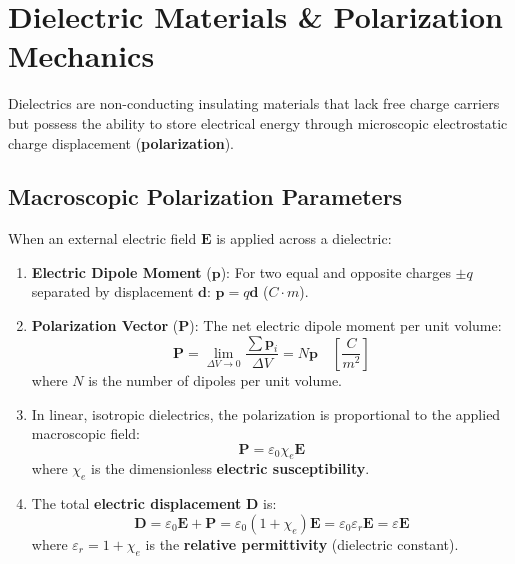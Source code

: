 \section{Dielectric Materials \& Polarization Mechanics}

Dielectrics are non-conducting insulating materials that lack free charge carriers but possess the ability to store electrical energy through microscopic electrostatic charge displacement (\textbf{polarization}).

\subsection{Macroscopic Polarization Parameters}
When an external electric field $\mathbf{E}$ is applied across a dielectric:
\begin{enumerate}
    \item \textbf{Electric Dipole Moment} ($\mathbf{p}$): For two equal and opposite charges $\pm q$ separated by displacement $\mathbf{d}$: $\mathbf{p} = q \mathbf{d}$ ($\si{C\cdot m}$).
    \item \textbf{Polarization Vector} ($\mathbf{P}$): The net electric dipole moment per unit volume:
    \begin{equation}
        \mathbf{P} = \lim_{\Delta V \to 0}\frac{\sum \mathbf{p}_i}{\Delta V} = N \mathbf{p} \quad \left[\si{\frac{C}{m^2}}\right]
    \end{equation}
    where $N$ is the number of dipoles per unit volume.
    \item In linear, isotropic dielectrics, the polarization is proportional to the applied macroscopic field:
    \begin{equation}
        \mathbf{P} = \varepsilon_0 \chi_e \mathbf{E}
    \end{equation}
    where $\chi_e$ is the dimensionless \textbf{electric susceptibility}.
    \item The total \textbf{electric displacement} $\mathbf{D}$ is:
    \begin{equation}
        \mathbf{D} = \varepsilon_0 \mathbf{E} + \mathbf{P} = \varepsilon_0 (1 + \chi_e)\mathbf{E} = \varepsilon_0 \varepsilon_r \mathbf{E} = \varepsilon \mathbf{E}
    \end{equation}
    where $\varepsilon_r = 1 + \chi_e$ is the \textbf{relative permittivity} (dielectric constant).
\end{enumerate}

